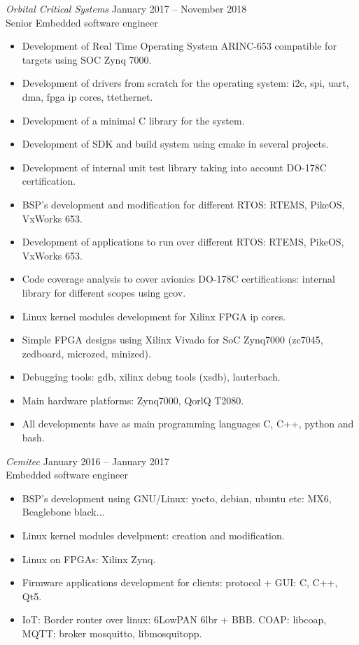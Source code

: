 \documentclass[10pt]{res} %
\begin{document}
\begin{resume}
{\sl Orbital Critical Systems} \hfill January 2017 -- November 2018\\
\hfill Senior Embedded software engineer
\begin{itemize} \itemsep -2pt %
\item Development of Real Time Operating System ARINC-653 compatible for targets using SOC Zynq 7000.
\item Development of drivers from scratch for the operating system: i2c, spi, uart, dma, fpga ip cores, ttethernet.
\item Development of a minimal C library for the system.
\item Development of SDK and build system using cmake in several projects.
\item Development of internal unit test library taking into account DO-178C certification.
\item BSP's development and modification for different RTOS: RTEMS, PikeOS, VxWorks 653.
\item Development of applications to run over different RTOS: RTEMS, PikeOS, VxWorks 653.
\item Code coverage analysis to cover avionics DO-178C certifications: internal library for different scopes using gcov.
\item Linux kernel modules development for Xilinx FPGA ip cores.
\item Simple FPGA designs using Xilinx Vivado for SoC Zynq7000 (zc7045, zedboard, microzed, minized).
\item Debugging tools: gdb, xilinx debug tools (xsdb), lauterbach.
\item Main hardware platforms: Zynq7000, QorlQ T2080.
\item All developments have as main programming languages C, C++, python and bash.
\end{itemize}

{\sl Cemitec} \hfill January 2016 -- January 2017\\
\hfill Embedded software engineer 
\begin{itemize} \itemsep -2pt %
\item BSP's development using GNU/Linux: yocto, debian, ubuntu etc: MX6, Beaglebone black...
\item Linux kernel modules develpment: creation and modification.
\item Linux on FPGAs: Xilinx Zynq.
\item Firmware applications development for clients: protocol + GUI: C, C++, Qt5.
\item IoT: Border router over linux: 6LowPAN 6lbr + BBB. COAP: libcoap, MQTT: broker mosquitto, libmosquitopp.
\end{itemize}


\end{resume}
\end{document}
